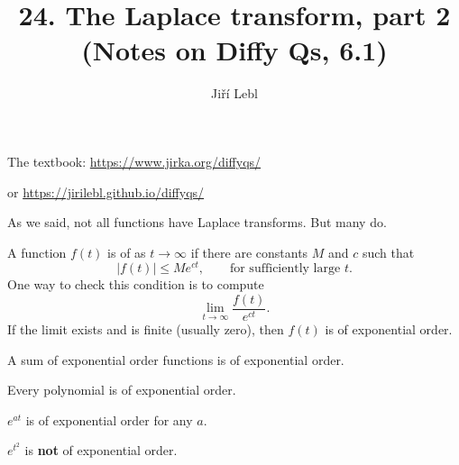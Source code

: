 \documentclass[10pt,aspectratio=169]{beamer}
\author{Ji\v{r}\'i Lebl}
\institute[OSU]{%
Oklahoma State University%
}
\title{24. The Laplace transform, part 2\\(Notes on Diffy Qs, 6.1)}
\date{}
\begin{document}
\begin{frame}
\titlepage


\begin{center}
The textbook: \url{https://www.jirka.org/diffyqs/}

or \url{https://jirilebl.github.io/diffyqs/}
\end{center}
\end{frame}

\begin{frame}
As we said, not all functions have Laplace transforms.  But many do.

\medskip
\pause

A function $f(t)$ is of
\emph{} as $t \to \infty$ if
there are constants $M$ and $c$ such that
\begin{equation*}
\lvert f(t) \rvert \leq M e^{ct} ,
\qquad
\text{for sufficiently large $t$} .
\end{equation*}
\pause
One way to check this condition is to compute
\begin{equation*}
\lim_{t\to \infty} \frac{f(t)}{e^{ct}} .
\end{equation*}
\pause
If the limit exists and is finite (usually zero), then $f(t)$ is of
exponential order.

\medskip
\pause

A sum of exponential order functions is of exponential order.

\pause
\medskip

Every polynomial is of exponential order.

\pause
\medskip

$e^{at}$ is of exponential order for any $a$.

\pause
\medskip

$e^{t^2}$ is \textbf{not} of exponential order.

\end{frame}
\end{document}
